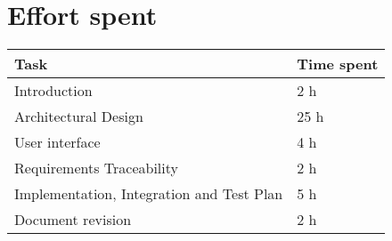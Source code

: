 \chapter{Effort spent}
\begin{tabular}{|l|l|}
	\hline
	Task & Time spent\\
	\hline
	Introduction & 2 h\\
	\hline
	Architectural Design & 25 h\\
	\hline
	User interface & 4 h\\
	\hline
	Requirements Traceability & 2 h\\
	\hline
	Implementation, Integration and Test Plan & 5 h\\
	\hline
	Document revision & 2 h\\
	\hline
\end{tabular}